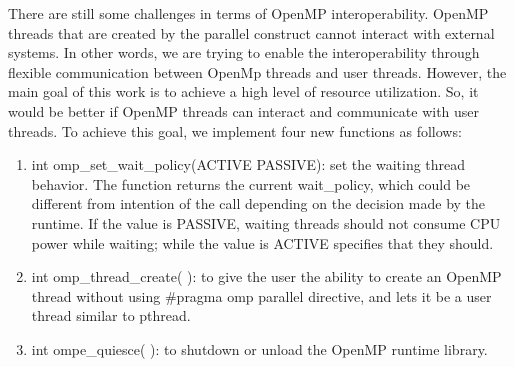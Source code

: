 There are still some challenges in terms of OpenMP interoperability. OpenMP threads that are created by the parallel construct cannot interact with external systems. In other words, we are trying to enable the interoperability through flexible communication between OpenMp threads and user threads. However, the main goal of this work is to achieve a high level of resource utilization. So, it would be better if OpenMP threads can interact and communicate with user threads. To achieve this goal, we implement four new functions as follows:
\begin{enumerate}
	\item int omp{\_}set{\_}wait{\_}policy(ACTIVE \textbar PASSIVE): 
	set the waiting thread behavior. The function returns the current wait{\_}policy, which could be different from intention of the call depending on the decision made by the runtime. If the value is PASSIVE, waiting threads should not consume CPU power while waiting; while the value is ACTIVE specifies that they should.
	\item int omp{\_}thread{\_}create( ): 
	to give the user the ability to create an OpenMP thread without using \#pragma omp parallel directive, and lets it be a user thread similar to pthread.
	\item int ompe{\_}quiesce( ): 
	to shutdown or unload the OpenMP runtime library.
\end{enumerate}
